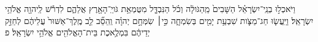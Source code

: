 \documentclass{openreader}
\begin{document}
וַיֹּאכְל֣וּ בְנֵֽי־יִשְׂרָאֵ֗ל הַשָּׁבִים֙ מֵֽהַגֹּולָ֔ה וְכֹ֗ל הַנִּבְדָּ֛ל מִטֻּמְאַ֥ת גֹּויֵֽ־הָאָ֖רֶץ אֲלֵהֶ֑ם לִדְרֹ֕שׁ לַֽיהוָ֖ה אֱלֹהֵ֥י יִשְׂרָאֵֽל׃ 
וַיַּֽעֲשׂ֧וּ חַג־מַצֹּ֛ות שִׁבְעַ֥ת יָמִ֖ים בְּשִׂמְחָ֑ה כִּ֣י׀ שִׂמְּחָ֣ם יְהוָ֗ה וְֽהֵסֵ֞ב לֵ֤ב מֶֽלֶךְ־אַשּׁוּר֙ עֲלֵיהֶ֔ם לְחַזֵּ֣ק יְדֵיהֶ֔ם בִּמְלֶ֥אכֶת בֵּית־הָאֱלֹהִ֖ים אֱלֹהֵ֥י יִשְׂרָאֵֽל׃ פ 
\end{document}
